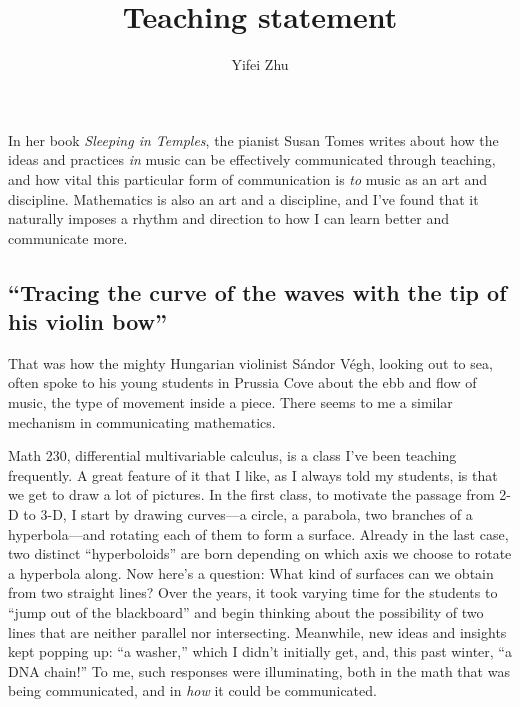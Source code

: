 \documentclass{rs}
\title{Teaching statement}
\author{Yifei Zhu}
\theoremstyle{definition}
\theoremstyle{remark}
\renewcommand{\=}{\approx}
\renewcommand{\-}{\sim}
\numberwithin{equation}{section}
\begin{document}
\maketitle



In her book {\em Sleeping in Temples}, the pianist Susan Tomes writes about 
how the ideas and practices {\em in} music can be effectively communicated 
through teaching, and how vital this particular form of communication is 
{\em to} music as an art and discipline.  Mathematics is also an art and a 
discipline, and I've found that it naturally imposes a rhythm and direction to 
how I can learn better and communicate more.  



\subsection*{``Tracing the curve of the waves with the tip of his violin bow''}

That was how the mighty Hungarian violinist S\'andor V\'egh, looking out to sea, 
often spoke to his young students in Prussia Cove about the ebb and flow of 
music, the type of movement inside a piece.  There seems to me a similar 
mechanism in communicating mathematics.  

Math 230, differential multivariable calculus, is a class I've been teaching 
frequently.  A great feature of it that I like, as I always told my students, is 
that we get to draw a lot of pictures.  In the first class, to motivate the 
passage from 2-D to 3-D, I start by drawing curves---a circle, a parabola, two 
branches of a hyperbola---and rotating each of them to form a surface.  Already 
in the last case, two distinct ``hyperboloids'' are born depending on which axis 
we choose to rotate a hyperbola along.  Now here's a question: What kind of 
surfaces can we obtain from two straight lines?  Over the years, it took varying 
time for the students to ``jump out of the blackboard'' and begin thinking about 
the possibility of two lines that are neither parallel nor intersecting.  
Meanwhile, new ideas and insights kept popping up: ``a washer,'' which I didn't 
initially get, and, this past winter, ``a DNA chain!''  To me, such responses 
were illuminating, both in the math that was being communicated, and in 
{\em how} it could be communicated.  
\end{document}
